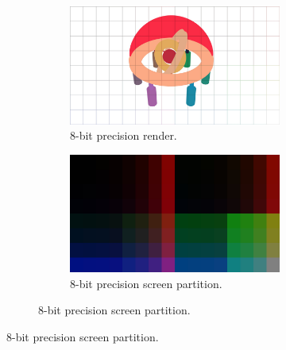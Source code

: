 \documentclass[conference]{IEEEtran}
\begin{document}



\onecolumn

\begin{figure}[htbp]
\centering
\begin{subfigure}{1.1\textwidth}
\begin{center}
\begin{minipage}[t]{\linewidth}
\hspace{-0.09\linewidth}
  \centering
    \begin{subfigure}{.49\textwidth}
      \centering
      \includegraphics[width=\linewidth]{8_render.jpg}
      \caption{8-bit precision render.}
      \label{fig:render_8}
    \end{subfigure}
    \begin{subfigure}{.49\textwidth}
      \centering
      \includegraphics[width=\linewidth]{8_partition.jpg}
      \caption{8-bit precision screen partition.}
      \label{fig:render_8}
    \end{subfigure}
  \label{fig:render_8}
\end{minipage}
\end{center}

\end{subfigure}
\end{figure}
\end{document}
